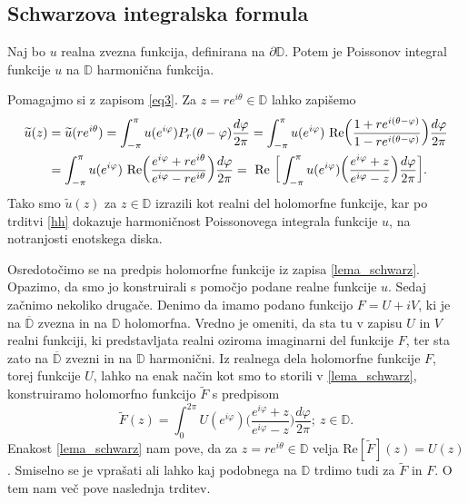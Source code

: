 \documentclass[mat1, tisk]{fmfdelo}
\begin{document}
\subsection{Schwarzova integralska formula}
     \begin{lema}
        \label{realnidel}
        Naj bo $u$ realna zvezna funkcija, definirana na $\partial \mathbb{D}$. Potem je Poissonov integral funkcije $u$ na $\mathbb{D}$ harmonična funkcija.
     \end{lema}
     \begin{dokaz}
        Pomagajmo si z zapisom \eqref{eq3}. Za $z = re^{i\theta} \in \mathbb{D}$ lahko zapišemo
            \begin{align}
                \label{lema_schwarz}
                \widetilde{u}(z) &= \widetilde{u}(r e^{i \theta}) = \int_{-\pi}^{\pi}{u(e^{i \varphi}) P_r(\theta - \varphi)\frac{d \varphi}{2 \pi}} = \int_{-\pi}^{\pi}{u(e^{i \varphi})~\text{Re}\bigg(\frac{1+re^{i(\theta - \varphi)}}{1-re^{i(\theta - \varphi)}}\bigg)\frac{d \varphi}{2 \pi}} \notag \\
                &= \int_{-\pi}^{\pi}{u(e^{i \varphi})~\text{Re}\bigg(\frac{e^{i\varphi}+re^{i\theta}}{e^{i\varphi}-re^{i\theta}}\bigg)\frac{d \varphi}{2 \pi}}=~\text{Re}~\bigg[\int_{-\pi}^{\pi}{u(e^{i \varphi})\bigg(\frac{e^{i\varphi}+z}{e^{i\varphi}-z}\bigg)\frac{d \varphi}{2 \pi}}\bigg].
            \end{align}
        Tako smo $\widetilde{u}(z)$ za $z \in \mathbb{D}$ izrazili kot realni del holomorfne funkcije, kar po trditvi \ref{hh} dokazuje harmoničnost Poissonovega integrala funkcije $u$, na notranjosti enotskega diska.
     \end{dokaz}

     Osredotočimo se na predpis holomorfne funkcije iz zapisa \eqref{lema_schwarz}. Opazimo, da smo jo konstruirali s pomočjo podane realne funkcije $u$. 
     Sedaj začnimo nekoliko drugače. Denimo da imamo podano funkcijo $F = U + iV$, ki je na $\overline{\mathbb{D}}$ zvezna in na $\mathbb{D}$ holomorfna. Vredno je omeniti, da sta tu v zapisu $U$ in $V$ realni funkciji, ki predstavljata realni oziroma imaginarni del funkcije $F$, ter sta zato na $\overline{\mathbb{D}}$ zvezni in na $\mathbb{D}$ harmonični.
     Iz realnega dela holomorfne funkcije $F$, torej funkcije $U$, lahko na enak način kot smo to storili v \eqref{lema_schwarz}, konstruiramo holomorfno funkcijo $\widetilde{F}$ s predpisom
     \begin{equation}
        \label{priprav_schwarz}
        \widetilde{F}(z) = \int_{0}^{2 \pi}{U(e^{i \varphi})\bigg(\frac{e^{i\varphi}+z}{e^{i\varphi}-z}\bigg)\frac{d \varphi}{2 \pi}};~z \in \mathbb{D}.
    \end{equation}
    Enakost \eqref{lema_schwarz} nam pove, da za $z = r e^{i\theta}\in \mathbb{D}$ velja $\text{Re}[\widetilde{F}](z) = U(z)$. Smiselno se je vprašati ali lahko kaj podobnega na $\mathbb{D}$ trdimo tudi za $\widetilde{F}$ in $F$. 
    O tem nam več pove naslednja trditev. 
\end{document}
